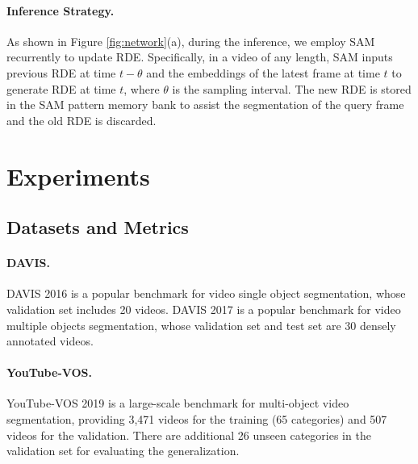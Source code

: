 \documentclass[10pt,twocolumn,letterpaper]{article}
\begin{document}
\paragraph{Inference Strategy.}
As shown in Figure \ref{fig:network}(a), during the inference, we employ SAM recurrently to update RDE. Specifically, in a video of any length, SAM inputs previous RDE at time $t-\theta$ and the embeddings of the latest frame at time  $t$ to generate RDE at time $t$, where $\theta$ is the sampling interval. The new RDE is stored in the SAM pattern memory bank to assist the segmentation of the query frame and the old RDE is discarded.
































\section{Experiments}
\subsection{Datasets and Metrics}
\paragraph{DAVIS.} DAVIS 2016 \cite{davis16} is a popular benchmark for  video single object segmentation, whose validation set includes  20 videos. DAVIS 2017 \cite{davis17} is a popular benchmark for video multiple objects segmentation, whose validation set and test set are 30 densely annotated videos. 
\vspace{-0.3em}
\paragraph{YouTube-VOS.} YouTube-VOS 2019 \cite{youtube} is a large-scale benchmark for multi-object video segmentation, providing 3,471 videos for the training (65 categories) and 507 videos for the validation. There are additional 26 unseen categories in the validation set for evaluating the generalization.
\vspace{-0.3em}
\end{document}
